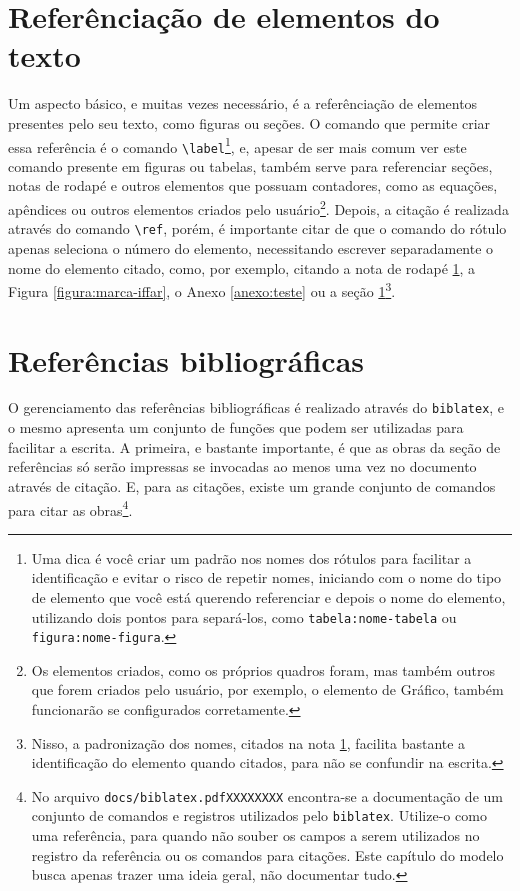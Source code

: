 \section{Referênciação de elementos do texto}\label{section:referencia}
Um aspecto básico, e muitas vezes necessário, é a referênciação de elementos presentes pelo seu texto, como figuras ou seções. O comando que permite criar essa referência é o comando \verb|\label|\footnote{\label{rodape:exemplo-ref}Uma dica é você criar um padrão nos nomes dos rótulos para facilitar a identificação e evitar o risco de repetir nomes, iniciando com o nome do tipo de elemento que você está querendo referenciar e depois o nome do elemento, utilizando dois pontos para separá-los, como \texttt{tabela:nome-tabela} ou \texttt{figura:nome-figura}.}, 
e, apesar de ser mais comum ver este comando presente em figuras ou tabelas, também serve para referenciar seções, notas de rodapé e outros elementos que possuam contadores, como as equações, apêndices ou outros elementos criados pelo usuário\footnote{Os elementos criados, como os próprios quadros foram, mas também outros que forem criados pelo usuário, por exemplo, o elemento de Gráfico, também funcionarão se configurados corretamente.}. 
Depois, a citação é realizada através do comando \verb|\ref|, porém, é importante citar de que o comando do rótulo apenas seleciona o número do elemento, necessitando escrever separadamente o nome do elemento citado, como, por exemplo, citando a nota de rodapé \ref{rodape:exemplo-ref}, a Figura \ref{figura:marca-iffar}, o Anexo \ref{anexo:teste} ou a seção \ref{section:referencia}\footnote{Nisso, a padronização dos nomes, citados na nota \ref{rodape:exemplo-ref}, facilita bastante a identificação do elemento quando citados, para não se confundir na escrita.}. %

\section{Referências bibliográficas}
O gerenciamento das referências bibliográficas é realizado através do \verb|biblatex|, e o mesmo apresenta um conjunto de funções que podem ser utilizadas para facilitar a escrita. A primeira, e bastante importante, é que as obras da seção de referências só serão impressas se invocadas ao menos uma vez no documento através de citação. E, para as citações, existe um grande conjunto de comandos para citar as obras\footnote{\label{nota:biblatex-cheatsheet}No arquivo \texttt{docs/biblatex.pdfXXXXXXXX} encontra-se a documentação de um conjunto de comandos e registros utilizados pelo \texttt{biblatex}. Utilize-o como uma referência, para quando não souber os campos a serem utilizados no registro da referência ou os comandos para citações. Este capítulo do modelo busca apenas trazer uma ideia geral, não documentar tudo.}.


